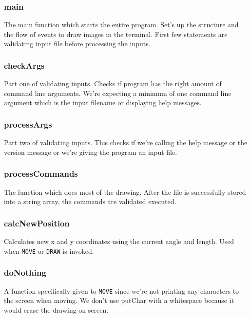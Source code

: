\documentclass[a4paper, 12pt, titlepage]{article}
\newcommand{\code}[1]{\small\texttt{#1}\normalsize}
\begin{document}
\subsubsection{main}

The main function which starts the entire program. Set's up the structure 
and the flow of events to draw images in the terminal. First few statements 
are validating input file before processing the inputs.

\subsubsection{checkArgs}

Part one of validating inputs. Checks if program has the right amount of 
command line arguments. We're expecting a minimum of one command line 
argument which is the input filename or displaying help messages.

\subsubsection{processArgs}

Part two of validating inputs. This checks if we're calling the help message 
or the version message or we're giving the program an input file.

\subsubsection{processCommands}

The function which does most of the drawing. After the file is successfully 
stored into a string array, the commands are validated executed.

\subsubsection{calcNewPosition}

Calculates new x and y coordinates using the current angle and length.
Used when \code{MOVE} or \code{DRAW} is invoked.

\subsubsection{doNothing}

A function specifically given to \code{MOVE} since we're not printing any 
characters to the screen when moving. We don't use putChar with a whitespace 
because it would erase the drawing on screen.
\end{document}
